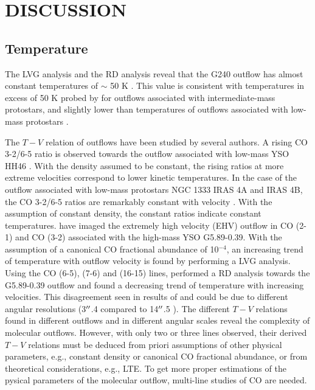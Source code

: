 \section{DISCUSSION}\label{discussion}

\subsection{Temperature}
The LVG analysis and the RD analysis reveal that the G240 outflow has almost constant temperatures of $\sim$ 50 K . This value is consistent with temperatures in excess of 50 K probed by \citet{2016A&A...587A..17V} for outflows associated with intermediate-mass protostars, and slightly lower than temperatures of outflows associated with low-mass protostars \citep{2009A&A...501..633V, 2012A&A...542A..86Y}.

The $T-V$ relation of outflows have been studied by several authors.  A rising CO 3-2/6-5 ratio is observed towards the outflow associated with low-mass YSO HH46 \citep{2009A&A...501..633V}. With the density assumed to be constant, the rising ratios at more extreme velocities correspond to lower kinetic temperatures. In the case of the outflow associated with low-mass protostars NGC 1333 IRAS 4A and  IRAS 4B, the CO 3-2/6-5 ratios are remarkably constant with velocity \citep{2012A&A...542A..86Y}. With the assumption of constant density, the constant ratios indicate constant temperatures. \citet{2012ApJ...744L..26S} have imaged the extremely high velocity (EHV) outflow in CO (2-1) and CO (3-2) associated with the high-mass YSO G5.89-0.39. With the assumption of a canonical CO fractional abundance of 10$^{-4}$, an increasing trend of temperature with outflow velocity is found by performing a LVG analysis. Using the CO (6-5), (7-6) and (16-15) lines, \citet{2015A&A...584A..70L} performed a RD analysis towards the G5.89-0.39 outflow and found a decreasing trend of temperature with increasing velocities. This disagreement seen in results of \citet{2012ApJ...744L..26S} and \citet{2015A&A...584A..70L} could be due to different angular resolutions (3${\mbox{$^{\prime\prime}$}}$.4 compared to 14${\mbox{$^{\prime\prime}$}}$.5 ). The different $T-V$ relations found in different outflows and in different angular scales reveal the complexity of molecular outflows. However, with only two or three lines observed, their derived $T-V$ relations must be deduced from priori assumptions of other physical parameters, e.g., constant density or canonical CO fractional abundance, or from theoretical considerations, e.g., LTE. To get more proper estimations of the pysical parameters of the molecular outflow, multi-line studies of CO are needed.

